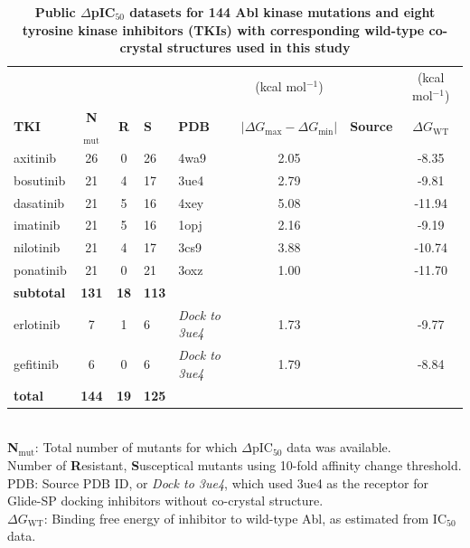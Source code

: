 \documentclass[phd,tocprelim]{cornell}
\begin{document}
%
\begin{landscape}
\begin{table}[p]
\centering
\caption[Public $\Delta$pIC$_{50}$ datasets for 144 Abl kinase mutations and eight tyrosine kinase inhibitors (TKIs) with corresponding wild-type co-crystal structures]{
\label{tab:table-1}
{\bf Public $\Delta$pIC$_{50}$ datasets for 144 Abl kinase mutations and eight tyrosine kinase inhibitors (TKIs) with corresponding wild-type co-crystal structures used in this study}
}
\setlength{\tabcolsep}{4pt}
\begin{tabularx}{\textwidth}{X c c X X S S S}
\toprule
			&				 		&			& 			&				& {(kcal mol$^{-1}$)}  										&										& {(kcal mol$^{-1}$)}		\\
{\bf TKI}	& {\bf N}$_\mathrm{mut}$& {\bf R}	& {\bf S}	& {\bf PDB}		& {$|\Delta G_\mathrm{max} - \Delta G_\mathrm{min}|$}	& {\bf Source}							& {$\Delta G_\mathrm{WT}$} \\
\toprule
axitinib	& 26					& 0			& 26		& 4wa9          & 2.05    												& \cite{Pemovska:Nature:2015}			& -8.35		\\
bosutinib	& 21					& 4			& 17		& 3ue4         	& 2.79    												& \cite{Gozgit3992}						& -9.81		\\
dasatinib	& 21					& 5			& 16		& 4xey        	& 5.08    												& \cite{Gozgit3992}						& -11.94	\\
imatinib	& 21					& 5			& 16		& 1opj          & 2.16    												& \cite{Gozgit3992} 					& -9.19		\\
nilotinib	& 21					& 4			& 17		& 3cs9       	& 3.88    												& \cite{Gozgit3992} 					& -10.74	\\
ponatinib	& 21					& 0			& 21		& 3oxz        	& 1.00    												& \cite{Gozgit3992} 					& -11.70	\\
%
{\bf subtotal}& {\bf 131}			&{\bf 18}	&{\bf 113}	& 				& 	    												& 										&	\\
%
erlotinib	& 7 					& 1			& 6			& \it{Dock to 3ue4}	& 1.73    												& \cite{Davis:Nat.Biotechnol.:2011}		& -9.77		\\
gefitinib	& 6						& 0			& 6			& \it{Dock to 3ue4}	& 1.79    												& \cite{Davis:Nat.Biotechnol.:2011}		& -8.84		\\
%
{\bf total}	& {\bf 144}				&{\bf 19}	&{\bf 125}	& 				&														&										& 	\\
\bottomrule

\end{tabularx}
\small
\smallskip
\\
{\bf N}$_\mathrm{mut}$: Total number of mutants for which $\Delta$pIC$_{50}$ data was available.\\
Number of {\bf R}esistant, {\bf S}usceptical mutants using 10-fold affinity change threshold.\\
PDB: Source PDB ID, or \emph{Dock to 3ue4}, which used 3ue4 as the receptor for Glide-SP docking inhibitors without co-crystal structure.\\
$\Delta G_\mathrm{WT}$: Binding free energy of inhibitor to wild-type Abl, as estimated from IC$_{50}$ data.
\end{table}
\end{landscape}
\end{document}
